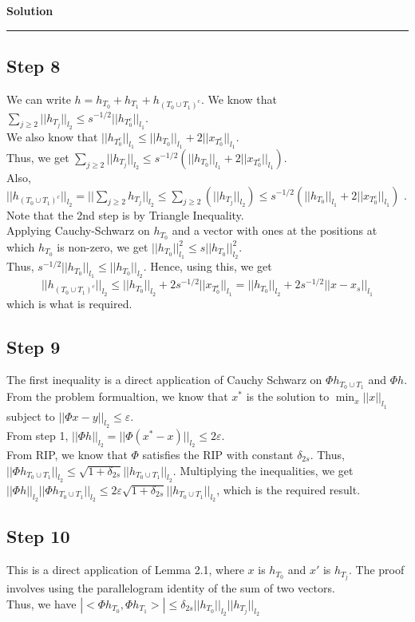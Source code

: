 \documentclass[a4paper,12pt]{article}
\newenvironment{solution}[2][]{%
    \begin{mdframed}[linecolor=blue!70!black, linewidth=2pt, roundcorner=10pt, backgroundcolor=yellow!10!white, skipabove=12pt, skipbelow=12pt]%
        \textbf{\large #2}
        \par\noindent\rule{\textwidth}{0.4pt}
}{
    \end{mdframed}
}
\begin{document}
\begin{solution}{Solution}
\subsection*{Step 8}
We can write $h = h_{T_0} + h_{T_1} + h_{(T_0 \cup T_1)^c}$. We know that $\sum_{j \geq 2}||h_{T_j}||_{l_2} \leq s^{-1/2}||h_{T_{0}^c}||_{l_1}$.\\
We also know that $||h_{T_0^c}||_{l_1} \leq ||h_{T_0}||_{l_1} + 2||x_{T_0^c}||_{l_1}$. \\
Thus, we get $\sum_{j \geq 2}||h_{T_j}||_{l_2} \leq  s^{-1/2}(||h_{T_0}||_{l_1} + 2||x_{T_0^c}||_{l_1})$.\\
Also, $||h_{(T_0\cup T_1)^c}||_{l_2} = ||\sum_{j\geq2}h_{T_j}||_{l_2} \leq  \sum_{j\geq2}(||h_{T_j}||_{l_2}) \leq s^{-1/2}(||h_{T_0}||_{l_1} + 2||x_{T_0^c}||_{l_1})$ .\\
Note that the 2nd step is by Triangle Inequality.\\
Applying Cauchy-Schwarz on $h_{T_0}$ and a vector with ones at the positions at which $h_{T_0}$ is non-zero, we get $||h_{T_0}||_{l_1}^2 \leq s||h_{T_0}||_{l_2}^2$. \\
Thus, $s^{-1/2}||h_{T_0}||_{l_1} \leq ||h_{T_0}||_{l_2}$. Hence, using this, we get 
\[
||h_{(T_0\cup T_1)^c}||_{l_2} \leq ||h_{T_0}||_{l_2} + 2s^{-1/2}||x_{T_0^c}||_{l_1} = ||h_{T_0}||_{l_2} + 2s^{-1/2}||x-x_s||_{l_1}
\]
which is what is required.

\subsection*{Step 9}
The first inequality is a direct application of Cauchy Schwarz on $\Phi h_{T_0 \cup T_1}$ and $\Phi h$.
\\
From the problem formualtion, we know that $x^*$ is the solution to $\min_x ||x||_{l_1}$ subject to $||\Phi x - y||_{l_2} \leq \varepsilon$.\\
From step 1, $||\Phi h||_{l_2} = ||\Phi (x^*-x)||_{l_2} \leq 2\varepsilon$.\\
From RIP, we know that $\Phi$ satisfies the RIP with constant $\delta_{2s}$. Thus,\\ $||\Phi h_{T_0 \cup T_1}||_{l_2} \leq \sqrt{1+\delta_{2s}} ||h_{T_0 \cup T_1}||_{l_2}$. Multiplying the inequalities, we get $||\Phi h||_{l_2}||\Phi h_{T_0 \cup T_1}||_{l_2} \leq 2\varepsilon\sqrt{1+\delta_{2s}} ||h_{T_0 \cup T_1}||_{l_2}$, which is the required result.

\subsection*{Step 10}
This is a direct application of Lemma 2.1, where $x$ is $h_{T_0}$ and $x'$ is $h_{T_j}$. The proof involves using the parallelogram identity of the sum of two vectors.\\
Thus, we have $|<\Phi h_{T_0},\Phi h_{T_1}>| \leq \delta_{2s} ||h_{T_0}||_{l_2}||h_{T_j}||_{l_2}$


\end{solution}
\end{document}
